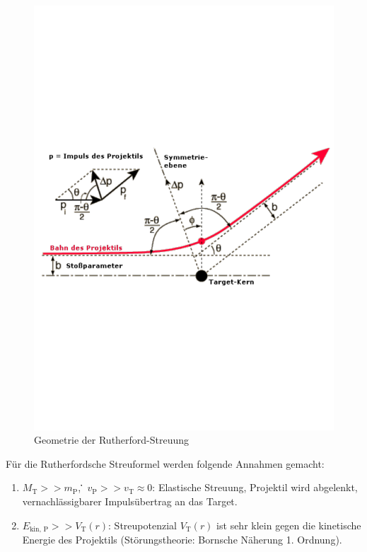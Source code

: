 \begin{figure}[h!]
  \centering
  \includegraphics[width=\textwidth]{images/rutherford.pdf}
  \caption{Geometrie der Rutherford-Streuung \cite{wupp}}
  \label{fig:rutherford}
\end{figure}
Für die Rutherfordsche Streuformel werden folgende Annahmen gemacht:
\begin{enumerate}
	\item $M_{\text{T}} >> m_{\text{P}}$, \. \. $v_{\text{P}} >> v_{\text{T}} \approx 0$: Elastische Streuung, Projektil wird abgelenkt, vernachlässigbarer Impulsübertrag an das Target.
	\item $E_{\text{kin, P}} >> V_{\text{T}}(r)$: Streupotenzial $V_{\text{T}}(r)$ ist sehr klein gegen die kinetische Energie des Projektils (Störungstheorie: Bornsche Näherung 1. Ordnung).
\end{enumerate}

%
%
